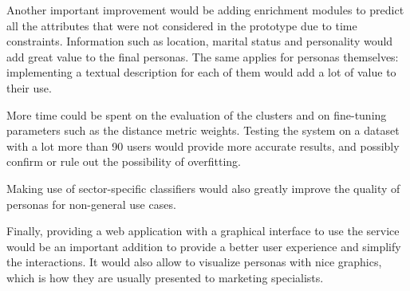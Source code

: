 Another important improvement would be adding enrichment modules to predict all the attributes that were not considered in the prototype due to time constraints. Information such as location, marital status and personality would add great value to the final personas. The same applies for personas themselves: implementing a textual description for each of them would add a lot of value to their use.

More time could be spent on the evaluation of the clusters and on fine-tuning parameters such as the distance metric weights. Testing the system on a dataset with a lot more than 90 users would provide more accurate results, and possibly confirm or rule out the possibility of overfitting.

Making use of sector-specific classifiers would also greatly improve the quality of personas for non-general use cases.

Finally, providing a web application with a graphical interface to use the service would be an important addition to provide a better user experience and simplify the interactions. It would also allow to visualize personas with nice graphics, which is how they are usually presented to marketing specialists.

